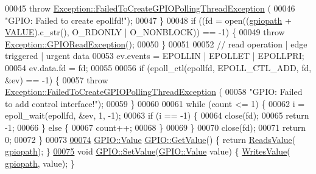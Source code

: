 \begin{DoxyCode}
00045     \textcolor{keywordflow}{throw} \hyperlink{class_hardware_1_1_exception_1_1_failed_to_create_g_p_i_o_polling_thread_exception}{Exception::FailedToCreateGPIOPollingThreadException}
      (
00046         \textcolor{stringliteral}{"GPIO: Failed to create epollfd!"});
00047   \}
00048   \textcolor{keywordflow}{if} ((fd = open((\hyperlink{class_hardware_1_1_g_p_i_o_ac47062ed6aba52b9e8506e1575bf5061}{gpiopath} + \hyperlink{_g_p_i_o_8h_aa0b03826c8f7cc324ac2db0ada2dce0a}{VALUE}).c\_str(), O\_RDONLY | O\_NONBLOCK)) == -1) \{
00049     \textcolor{keywordflow}{throw} \hyperlink{class_hardware_1_1_exception_1_1_g_p_i_o_read_exception}{Exception::GPIOReadException}();
00050   \}
00051 
00052   \textcolor{comment}{// read operation | edge triggered | urgent data}
00053   ev.events = EPOLLIN | EPOLLET | EPOLLPRI;
00054   ev.data.fd = fd;
00055 
00056   \textcolor{keywordflow}{if} (epoll\_ctl(epollfd, EPOLL\_CTL\_ADD, fd, &ev) == -1) \{
00057     \textcolor{keywordflow}{throw} \hyperlink{class_hardware_1_1_exception_1_1_failed_to_create_g_p_i_o_polling_thread_exception}{Exception::FailedToCreateGPIOPollingThreadException}
      (
00058         \textcolor{stringliteral}{"GPIO: Failed to add control interface!"});
00059   \}
00060 
00061   \textcolor{keywordflow}{while} (count <= 1) \{
00062     i = epoll\_wait(epollfd, &ev, 1, -1);
00063     \textcolor{keywordflow}{if} (i == -1) \{
00064       close(fd);
00065       \textcolor{keywordflow}{return} -1;
00066     \} \textcolor{keywordflow}{else} \{
00067       count++;
00068     \}
00069   \}
00070   close(fd);
00071   \textcolor{keywordflow}{return} 0;
00072 \}
00073 
\hypertarget{_g_p_i_o_8cpp_source_l00074}{}\hyperlink{class_hardware_1_1_g_p_i_o_a7bb00a19893d4cc5432d81fc306223ac}{00074} \hyperlink{class_hardware_1_1_g_p_i_o_ad357201dc1ad13ad96ba1773108a5f6d}{GPIO::Value} \hyperlink{class_hardware_1_1_g_p_i_o_a7bb00a19893d4cc5432d81fc306223ac}{GPIO::GetValue}() \{ \textcolor{keywordflow}{return} \hyperlink{class_hardware_1_1_g_p_i_o_a2af76b35edfeae57ee5393f8455e2522}{ReadsValue}(
      \hyperlink{class_hardware_1_1_g_p_i_o_ac47062ed6aba52b9e8506e1575bf5061}{gpiopath}); \}
\hypertarget{_g_p_i_o_8cpp_source_l00075}{}\hyperlink{class_hardware_1_1_g_p_i_o_a2564893797de6a2dab596c4fc990b919}{00075} \textcolor{keywordtype}{void} \hyperlink{class_hardware_1_1_g_p_i_o_a2564893797de6a2dab596c4fc990b919}{GPIO::SetValue}(\hyperlink{class_hardware_1_1_g_p_i_o_ad357201dc1ad13ad96ba1773108a5f6d}{GPIO::Value} value) \{ \hyperlink{class_hardware_1_1_g_p_i_o_a143da5d0e47450cd4080754d81026dc9}{WritesValue}(
      \hyperlink{class_hardware_1_1_g_p_i_o_ac47062ed6aba52b9e8506e1575bf5061}{gpiopath}, value); \}

\end{DoxyCode}

